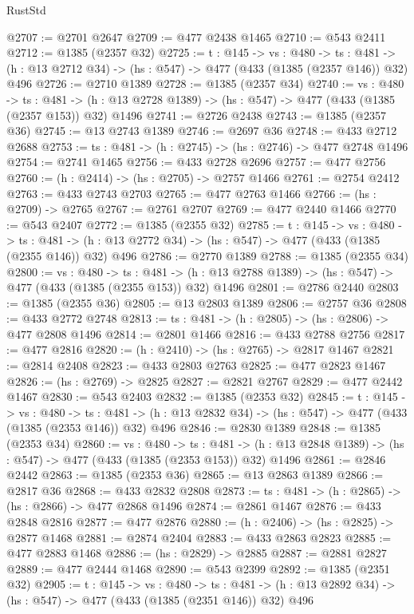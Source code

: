 \begin{lexlean}{RustStd}
\begin{coremodule}
{\begin{coremodule}
{{{{{{{@2707 := @2701 @2647
@2709 := @477 @2438 @1465
@2710 := @543 @2411
@2712 := @1385 (@2357 @32)
@2725 := {t : @145} ->
  {vs : @480} ->
  {ts : @481} -> (h : @13 @2712 @34) -> (hs : @547) -> @477 (@433 (@1385 (@2357 @146)) @32) @496
@2726 := @2710 @1389
@2728 := @1385 (@2357 @34)
@2740 := {vs : @480} ->
  {ts : @481} -> (h : @13 @2728 @1389) -> (hs : @547) -> @477 (@433 (@1385 (@2357 @153)) @32) @1496
@2741 := @2726 @2438
@2743 := @1385 (@2357 @36)
@2745 := @13 @2743 @1389
@2746 := @2697 @36
@2748 := @433 @2712 @2688
@2753 := {ts : @481} -> (h : @2745) -> (hs : @2746) -> @477 @2748 @1496
@2754 := @2741 @1465
@2756 := @433 @2728 @2696
@2757 := @477 @2756
@2760 := (h : @2414) -> (hs : @2705) -> @2757 @1466
@2761 := @2754 @2412
@2763 := @433 @2743 @2703
@2765 := @477 @2763 @1466
@2766 := (hs : @2709) -> @2765
@2767 := @2761 @2707
@2769 := @477 @2440 @1466
@2770 := @543 @2407
@2772 := @1385 (@2355 @32)
@2785 := {t : @145} ->
  {vs : @480} ->
  {ts : @481} -> (h : @13 @2772 @34) -> (hs : @547) -> @477 (@433 (@1385 (@2355 @146)) @32) @496
@2786 := @2770 @1389
@2788 := @1385 (@2355 @34)
@2800 := {vs : @480} ->
  {ts : @481} -> (h : @13 @2788 @1389) -> (hs : @547) -> @477 (@433 (@1385 (@2355 @153)) @32) @1496
@2801 := @2786 @2440
@2803 := @1385 (@2355 @36)
@2805 := @13 @2803 @1389
@2806 := @2757 @36
@2808 := @433 @2772 @2748
@2813 := {ts : @481} -> (h : @2805) -> (hs : @2806) -> @477 @2808 @1496
@2814 := @2801 @1466
@2816 := @433 @2788 @2756
@2817 := @477 @2816
@2820 := (h : @2410) -> (hs : @2765) -> @2817 @1467
@2821 := @2814 @2408
@2823 := @433 @2803 @2763
@2825 := @477 @2823 @1467
@2826 := (hs : @2769) -> @2825
@2827 := @2821 @2767
@2829 := @477 @2442 @1467
@2830 := @543 @2403
@2832 := @1385 (@2353 @32)
@2845 := {t : @145} ->
  {vs : @480} ->
  {ts : @481} -> (h : @13 @2832 @34) -> (hs : @547) -> @477 (@433 (@1385 (@2353 @146)) @32) @496
@2846 := @2830 @1389
@2848 := @1385 (@2353 @34)
@2860 := {vs : @480} ->
  {ts : @481} -> (h : @13 @2848 @1389) -> (hs : @547) -> @477 (@433 (@1385 (@2353 @153)) @32) @1496
@2861 := @2846 @2442
@2863 := @1385 (@2353 @36)
@2865 := @13 @2863 @1389
@2866 := @2817 @36
@2868 := @433 @2832 @2808
@2873 := {ts : @481} -> (h : @2865) -> (hs : @2866) -> @477 @2868 @1496
@2874 := @2861 @1467
@2876 := @433 @2848 @2816
@2877 := @477 @2876
@2880 := (h : @2406) -> (hs : @2825) -> @2877 @1468
@2881 := @2874 @2404
@2883 := @433 @2863 @2823
@2885 := @477 @2883 @1468
@2886 := (hs : @2829) -> @2885
@2887 := @2881 @2827
@2889 := @477 @2444 @1468
@2890 := @543 @2399
@2892 := @1385 (@2351 @32)
@2905 := {t : @145} ->
  {vs : @480} ->
  {ts : @481} -> (h : @13 @2892 @34) -> (hs : @547) -> @477 (@433 (@1385 (@2351 @146)) @32) @496
}}}}}}}
\end{coremodule}}
\end{coremodule}
\end{lexlean}
